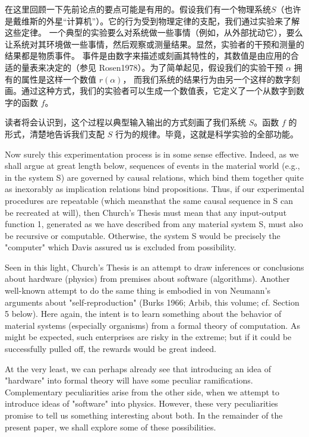 \documentclass[a4paper,12pt]{article}
\begin{document}
在这里回顾一下先前论点的要点可能是有用的。假设我们有一个物理系统$S$（也许是戴维斯的外星“计算机”）。它的行为受到物理定律的支配，我们通过实验来了解这些定律。
一个典型的实验要么对系统做一些事情（例如，从外部扰动它），要么让系统对其环境做一些事情，然后观察或测量结果。显然，实验者的干预和测量的结果都是物质事件。
事件是由数字来描述或刻画其特性的，其数值是由应用的合适的量表来决定的（参见 Rosen1978）。为了简单起见，假设我们的实验干预 $\alpha$ 拥有的属性是这样一个数值 $r(\alpha)$，
而我们系统的结果行为由另一个这样的数字刻画。通过这种方式，我们的实验者可以生成一个数值表，它定义了一个从数字到数字的函数 $f$。


读者将会认识到，这个过程以典型输入输出的方式刻画了我们系统 $S$。函数 $f$ 的形式，清楚地告诉我们支配 $S$ 行为的规律。毕竟，这就是科学实验的全部功能。



Now surely this experimentation process is in some sense effective. Indeed, as we shall argue at great length below, sequences of events in the
material world (e.g., in the system S) are governed by causal relations, which bind them together quite as inexorably as implication relations
bind propositions. Thus, if our experimental procedures are repeatable (which meansthat the same causal sequence in S can be recreated at will),
then Church's Thesis must mean that any input-output function 1, generated as we have described from any material system S,
must also be recursive or computable. Otherwise, the system S would be precisely the "computer" which Davis assured us is excluded from possibility.

Seen in this light, Church's Thesis is an attempt to draw inferences or conclusions about hardware (physics) from premises about software
(algorithms). Another well-known attempt to do the same thing is embodied in von Neumann's arguments about "self-reproduction"
(Burks 1966; Arbib, this volume; cf. Section 5 below). Here again, the intent is to learn something about the behavior of material systems
(especially organisms) from a formal theory of computation. As might be expected, such enterprises are risky in the extreme;
but if it could be successfully pulled off, the rewards would be great indeed.

At the very least, we can perhaps already see that introducing an idea of "hardware" into formal theory will have some peculiar
ramifications. Complementary peculiarities arise from the other side, when we attempt to introduce ideas of "software" into physics.
However, these very peculiarities promise to tell us something interesting about both. In the remainder of the present paper, we shall
explore some of these possibilities.
\end{document}
